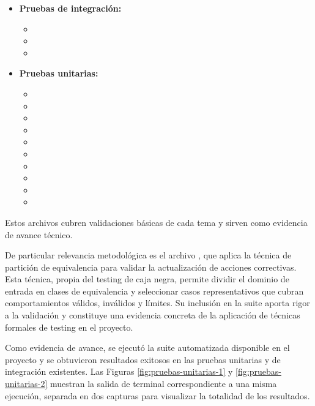 \documentclass[final]{udpthesis}
\begin{document}
\begin{itemize}
    \item \textbf{Pruebas de integración:}
    \begin{itemize}
        \item {}
        \item {}
        \item {}
    \end{itemize}
    \item \textbf{Pruebas unitarias:}
    \begin{itemize}
        \item {}
        \item {}
        \item {}
        \item {}
        \item {}
        \item {}
        \item {}
        \item {}
        \item {}
        \item {}
    \end{itemize}
\end{itemize}

Estos archivos cubren validaciones básicas de cada tema y sirven como evidencia de avance técnico.

De particular relevancia metodológica es el archivo , que aplica la técnica de partición de equivalencia para validar la actualización de acciones correctivas. Esta técnica, propia del testing de caja negra, permite dividir el dominio de entrada en clases de equivalencia y seleccionar casos representativos que cubran comportamientos válidos, inválidos y límites. Su inclusión en la suite aporta rigor a la validación y constituye una evidencia concreta de la aplicación de técnicas formales de testing en el proyecto.

Como evidencia de avance, se ejecutó la suite automatizada disponible en el proyecto y se obtuvieron resultados exitosos en las pruebas unitarias y de integración existentes. Las Figuras \ref{fig:pruebas-unitarias-1} y \ref{fig:pruebas-unitarias-2} muestran la salida de terminal correspondiente a una misma ejecución, separada en dos capturas para visualizar la totalidad de los resultados.
\end{document}
